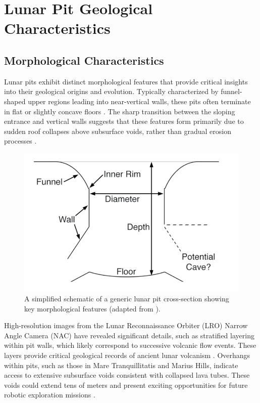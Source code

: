 \graphicspath{{img/ch2}}

\section{Lunar Pit Geological Characteristics}

\subsection{Morphological Characteristics}

Lunar pits exhibit distinct morphological features that provide critical insights into their geological origins and evolution. Typically characterized by funnel-shaped upper regions leading into near-vertical walls, these pits often terminate in flat or slightly concave floors \cite{new-wagner, lunar-pits-numerical-modelling, lunar-pit-distribution}. The sharp transition between the sloping entrance and vertical walls suggests that these features form primarily due to sudden roof collapses above subsurface voids, rather than gradual erosion processes \cite{lunar-pits-numerical-modelling, new-wagner}.

\begin{figure}[h!]
    \centering
    \includegraphics[width=0.5\linewidth]{lunar_pit_schema.png}
    \caption{A simplified schematic of a generic lunar pit cross-section showing key morphological features (adapted from \cite{new-wagner}).}
    \label{fig:lunar-pit-schema}
\end{figure}

High-resolution images from the Lunar Reconnaissance Orbiter (LRO) Narrow Angle Camera (NAC) have revealed significant details, such as stratified layering within pit walls, which likely correspond to successive volcanic flow events. These layers provide critical geological records of ancient lunar volcanism \cite{lunar-pits-entrances-to-caves, Carrer2024}. Overhangs within pits, such as those in Mare Tranquillitatis and Marius Hills, indicate access to extensive subsurface voids consistent with collapsed lava tubes. These voids could extend tens of meters and present exciting opportunities for future robotic exploration missions \cite{lunar-pits-numerical-modelling, radar-observations-lava-tubes}.

